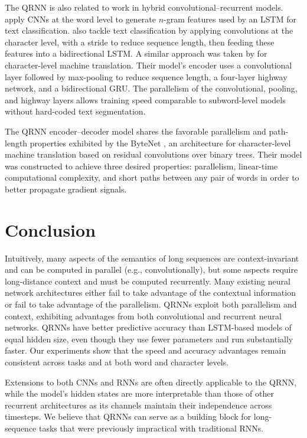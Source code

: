 \documentclass{article} \usepackage{iclr2017_conference,times}
\begin{document}
The QRNN is also related to work in hybrid convolutional--recurrent models. \citet{Zhou2015b} apply CNNs at the word level to generate $n$-gram features used by an LSTM for text classification. \citet{Xiao2016} also tackle text classification by applying convolutions at the character level, with a stride to reduce sequence length, then feeding these features into a bidirectional LSTM. A similar approach was taken by \citet{Lee2016} for character-level machine translation. Their model's encoder uses a convolutional layer followed by max-pooling to reduce sequence length, a four-layer highway network, and a bidirectional GRU.
The parallelism of the convolutional, pooling, and highway layers allows training speed comparable to subword-level models without hard-coded text segmentation.

The QRNN encoder--decoder model shares the favorable parallelism and path-length properties exhibited by the ByteNet \citep{Kalchbrenner2016}, an architecture for character-level machine translation based on residual convolutions over binary trees. Their model was constructed to achieve three desired properties: parallelism, linear-time computational complexity, and short paths between any pair of words in order to better propagate gradient signals.

\section{Conclusion}

Intuitively, many aspects of the semantics of long sequences are context-invariant and can be computed in parallel (e.g., convolutionally), but some aspects require long-distance context and must be computed recurrently. Many existing neural network architectures either fail to take advantage of the contextual information or fail to take advantage of the parallelism.
QRNNs exploit both parallelism and context, exhibiting advantages from both convolutional and recurrent neural networks.
QRNNs have better predictive accuracy than LSTM-based models of equal hidden size, even though they use fewer parameters and run substantially faster.
Our experiments show that the speed and accuracy advantages remain consistent across tasks and at both word and character levels.

Extensions to both CNNs and RNNs are often directly applicable to the QRNN, while the model's hidden states are more interpretable than those of other recurrent architectures as its channels maintain their independence across timesteps.
We believe that QRNNs can serve as a building block for long-sequence tasks that were previously impractical with traditional RNNs.
\end{document}
